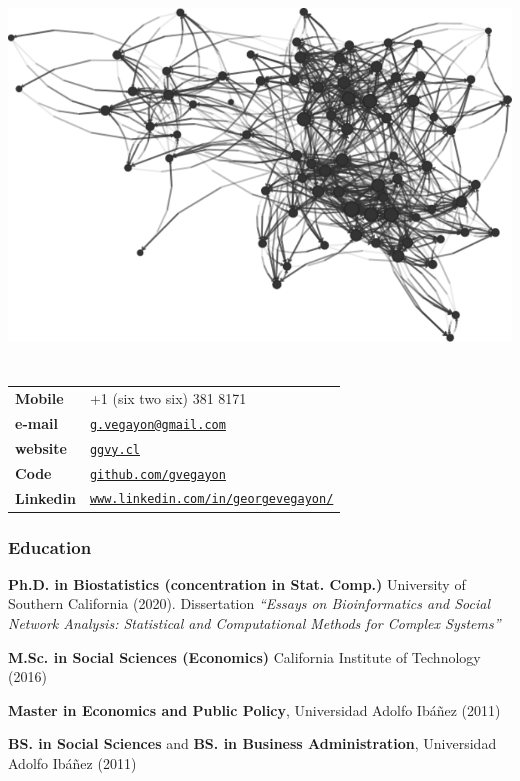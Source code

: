 \documentclass[letterpaper, 11pt]{article}
\def\name{George G. Vega Yon}
\renewenvironment{itemize}{
  \begin{list}{}{
    \setlength{\leftmargin}{0.45cm}
  }
}{
  \end{list}
}
\renewcommand{\bf}{\bfseries\color{teal}}
\begin{document}
	
	\hfill \includegraphics[width=.4\linewidth]{fig/ukfaculty.pdf}\vspace{-6cm}
	\part*{\color{darkgray}{\name}}





\begin{minipage}{0.50\linewidth}
  \begin{tabular}{>{\bfseries}p{.2\linewidth}p{.79\linewidth}}
    Mobile & +1 (six two six) 381 8171 \\
    e-mail & \href{mailto:g.vegayon@gmail.com}{\tt g.vegayon@gmail.com} \\
    website & \href{https://ggvy.cl}{\tt ggvy.cl} \\
    Code & \href{https://github.com/gvegayon}{\tt github.com/gvegayon}\\
    Linkedin & \href{https://www.linkedin.com/in/georgevegayon/}{\tt www.linkedin.com/in/georgevegayon/} %
  \end{tabular}
\end{minipage}


\section*{Education}

\begin{itemize}
\item 
{\bf Ph.D. in Biostatistics (concentration in Stat. Comp.)} University of Southern California (2020). Dissertation \emph{``Essays on Bioinformatics and Social Network Analysis: Statistical and Computational Methods for Complex Systems''}

{\bf M.Sc. in Social Sciences (Economics)} California Institute of Technology (2016)

{\bf Master in Economics and Public Policy}, Universidad Adolfo Ib\'a\~nez (2011)

{\bf BS. in Social Sciences} and {\bf BS. in Business Administration}, Universidad Adolfo Ib\'a\~nez (2011)
\end{itemize}
\end{document}
